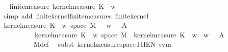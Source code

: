 \begin{isabellebody}
\ \isamarkupfalse%
\ {\isachardoublequoteopen}finite{\isacharunderscore}{\kern0pt}measure\ {\isacharparenleft}{\kern0pt}kernel{\isacharunderscore}{\kern0pt}measure\ K\ {\isacharparenleft}{\kern0pt}{\isasymomega}\ w{\isacharparenright}{\kern0pt}{\isacharparenright}{\kern0pt}{\isachardoublequoteclose}\isanewline
\ \ \ \ \ \ \ \ \isamarkupfalse%
\ {\isacharparenleft}{\kern0pt}simp\ add{\isacharcolon}{\kern0pt}\ finite{\isacharunderscore}{\kern0pt}kernel{\isachardot}{\kern0pt}finite{\isacharunderscore}{\kern0pt}measures\ finite{\isacharunderscore}{\kern0pt}kernel{\isacharparenright}{\kern0pt}\isanewline
\ \ \ \ \ \ \isamarkupfalse%
\ \isamarkupfalse%
\ {\isachardoublequoteopen}kernel{\isacharunderscore}{\kern0pt}measure\ K\ {\isacharparenleft}{\kern0pt}{\isasymomega}\ w{\isacharparenright}{\kern0pt}\ {\isacharparenleft}{\kern0pt}space\ M{}\ {\isacharminus}{\kern0pt}\ {\isacharbraceleft}{\kern0pt}{\isasymomega}\ {\isacharparenleft}{\kern0pt}w{\isacharcomma}{\kern0pt}\ {\isasymomega}\ {\isasymin}\ A{\isacharbraceright}{\kern0pt}{\isacharparenright}{\kern0pt}\ {\isacharequal}{\kern0pt}\ \isanewline
\ \ \ \ \ \ \ \ \ \ kernel{\isacharunderscore}{\kern0pt}measure\ K\ {\isacharparenleft}{\kern0pt}{\isasymomega}\ w{\isacharparenright}{\kern0pt}\ {\isacharparenleft}{\kern0pt}space\ M{}{\isacharparenright}{\kern0pt}\ {\isacharminus}{\kern0pt}\ kernel{\isacharunderscore}{\kern0pt}measure\ K\ {\isacharparenleft}{\kern0pt}{\isasymomega}\ w{\isacharparenright}{\kern0pt}\ {\isacharbraceleft}{\kern0pt}{\isasymomega}\ {\isacharparenleft}{\kern0pt}w{\isacharcomma}{\kern0pt}\ {\isasymomega}\ {\isasymin}\ A{\isacharbraceright}{\kern0pt}{\isachardoublequoteclose}\isanewline
\ \ \ \ \ \ \ \ \isamarkupfalse%
\ M{}{\isacharunderscore}{\kern0pt}def\ \isamarkupfalse%
\ {\isacharparenleft}{\kern0pt}subst\ kernel{\isacharunderscore}{\kern0pt}measure{\isacharunderscore}{\kern0pt}space{\isacharbrackleft}{\kern0pt}THEN\ sym{\isacharbrackright}{\kern0pt}{\isacharparenright}{\kern0pt}{\isacharplus}{\kern0pt}\isanewline
\ \ \ \ \ \ \ \ \isamarkupfalse%

\end{isabellebody}
